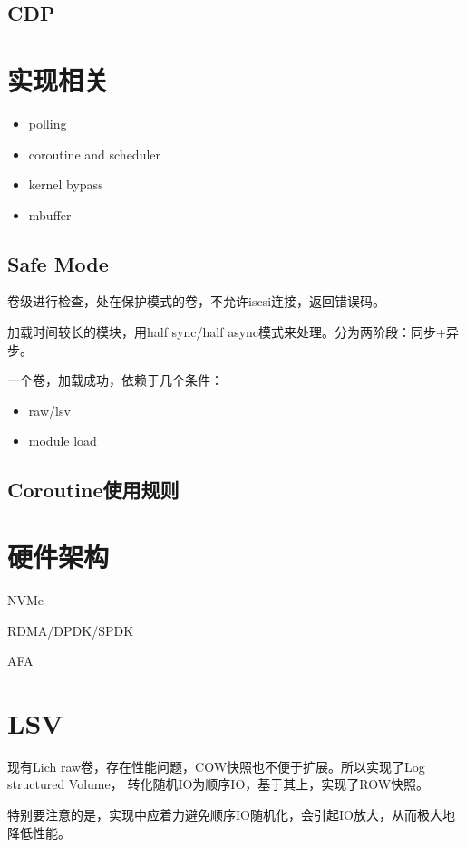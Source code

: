 \documentclass[UTF8]{ctexart}
\begin{document}
\subsection{CDP}

\section{实现相关}

\begin{itemize}
    \item polling
    \item coroutine and scheduler
    \item kernel bypass
    \item mbuffer
\end{itemize}

\subsection{Safe Mode}

卷级进行检查，处在保护模式的卷，不允许iscsi连接，返回错误码。

加载时间较长的模块，用half sync/half async模式来处理。分为两阶段：同步+异步。

一个卷，加载成功，依赖于几个条件：
\begin{itemize}
    \item raw/lsv
    \item module load
\end{itemize}

\subsection{Coroutine使用规则}


\section{硬件架构}

NVMe

RDMA/DPDK/SPDK

AFA


\section{LSV}

现有Lich raw卷，存在性能问题，COW快照也不便于扩展。所以实现了Log structured Volume，
转化随机IO为顺序IO，基于其上，实现了ROW快照。

特别要注意的是，实现中应着力避免顺序IO随机化，会引起IO放大，从而极大地降低性能。
\end{document}

